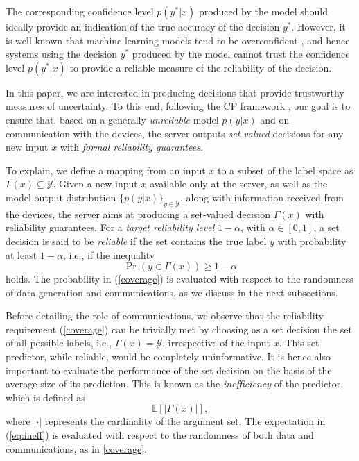 \documentclass[12pt, draftclsnofoot, onecolumn]{IEEEtran}
\begin{document}
The corresponding confidence level $p(y^*|x)$ produced by the model should ideally provide an indication of the true accuracy of the decision $ y^*$. However, it is well known that machine learning models tend to be overconfident \cite{bai2021don,guo2017calibration,cohen2022calibrating}, and hence systems using the decision $y^*$ produced by the model cannot trust the confidence level $p(y^*|x)$ to provide a reliable measure of the reliability of the decision.

In this paper, we are interested in producing decisions that provide trustworthy measures of uncertainty. To this end, following the CP framework \cite{vovk2005algorithmic}, our goal is to ensure that, based on a generally \emph{unreliable} model $p(y|x)$ and on communication with the devices, the server outputs \emph{set-valued} decisions for any new input $x$ with \emph{formal reliability guarantees}.

To explain, we define a mapping from an input $x$ to a subset of the label space as $\Gamma(x)\subseteq \mathcal{Y}$. Given a new input $x$ available only at the server, as well as the model output distribution $\{p(y|x)\}_{y\in\mathcal{Y}}$, along with information received from the devices, the server aims at producing a set-valued decision $\Gamma(x)$ with reliability guarantees. For a \emph{target reliability level} $1-\alpha$, with $\alpha\in [0,1]$, a set decision is said to be \emph{reliable} if the set contains the true label $y$ with probability at least $1-\alpha$, i.e., if the inequality
\begin{equation}\label{coverage}
    \Pr(y \in \Gamma(x))\geq 1-\alpha
\end{equation}
holds. The probability in (\ref{coverage}) is evaluated with respect to the randomness of data generation and communications, as we discuss in the next subsections.

Before detailing the role of communications, we observe that the reliability requirement (\ref{coverage}) can be trivially met by choosing as a set decision the set of all possible labels, i.e., $\Gamma(x)=\mathcal{Y}$, irrespective of the input $x$. This set predictor, while reliable, would be completely uninformative. It is hence also important to evaluate the performance of the set decision on the basis of the average size of its prediction. This is known as the \emph{inefficiency} of the predictor, which is defined as
\begin{equation}\label{eq:ineff}
    \mathbb{E}\left[\left|\Gamma(x)\right|\right],
\end{equation}
where $|\cdot|$ represents the cardinality of the argument set. The expectation in (\ref{eq:ineff}) is evaluated with respect to the randomness of both data and communications, as in \eqref{coverage}.
\end{document}
